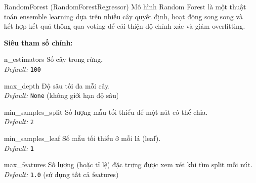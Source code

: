 \documentclass[12pt,a4paper]{article}
\newenvironment{methodlist}{
    \begin{description}[style=nextline, font=\ttfamily\color{sklearn-blue}]
}{
    \end{description}
}
\begin{document}
\begin{modelbox}{RandomForest (RandomForestRegressor)}
Mô hình Random Forest là một thuật toán ensemble learning dựa trên nhiều cây quyết định, hoạt động song song và kết hợp kết quả thông qua voting để cải thiện độ chính xác và giảm overfitting.

\vspace{0.2cm}
\textbf{Siêu tham số chính:}
\begin{methodlist}
    \item[n\_estimators] 
    Số cây trong rừng. \\ 
    \textit{Default:} \texttt{100}
    
    \item[max\_depth] 
    Độ sâu tối đa mỗi cây. \\ 
    \textit{Default:} \texttt{None} (không giới hạn độ sâu)
    
    \item[min\_samples\_split] 
    Số lượng mẫu tối thiểu để một nút có thể chia. \\ 
    \textit{Default:} \texttt{2}
    
    \item[min\_samples\_leaf] 
    Số mẫu tối thiểu ở mỗi lá (leaf). \\ 
    \textit{Default:} \texttt{1}
    
    \item[max\_features] 
    Số lượng (hoặc tỉ lệ) đặc trưng được xem xét khi tìm split mỗi nút. \\ 
    \textit{Default:} \texttt{1.0} (sử dụng tất cả features)
\end{methodlist}
\end{modelbox}
\end{document}
